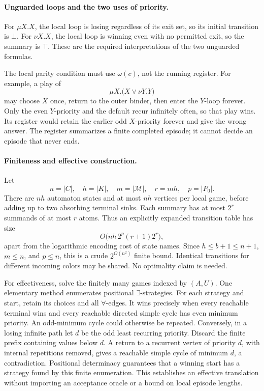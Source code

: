 \paragraph{Unguarded loops and the two uses of priority.}
For \(\mu X.X\), the local loop is
losing regardless of its exit set,
so its initial transition is \(\bot\).
For \(\nu X.X\), the local loop is
winning even with no permitted exit,
so the summary is \(\top\).
These are the required interpretations
of the two unguarded formulas.

The local parity condition must use
\(\omega(c)\), not the running register.
For example, a play of
\[
 \mu X.\bigl(X\lor\nu Y.Y\bigr)
\]
may choose \(X\) once, return to the
outer binder, then enter the
\(Y\)-loop forever.
Only the even \(Y\)-priority and
the default recur infinitely often,
so that play wins. Its register
would retain the earlier odd
\(X\)-priority forever and give
the wrong answer. The register
summarizes a finite completed
episode; it cannot decide an
episode that never ends.

\paragraph{Finiteness and effective construction.}
\label{sec:p09-mu-automaton-finiteness}
Let
\[
 n=|C|,\quad h=|K|,\quad
 m=|\mathcal M|,\quad r=mh,\quad p=|P_0|.
\]
There are \(nh\) automaton states and
at most \(nh\) vertices per local
game, before adding up to two
absorbing terminal sinks.
Each summary has at most \(2^r\)
summands of at most \(r\) atoms.
Thus an explicitly expanded transition
table has size
\[
 O\bigl(nh\,2^p(r+1)2^r\bigr),
\]
apart from the logarithmic encoding
cost of state names. Since
\(h\le b+1\le n+1\), \(m\le n\),
and \(p\le n\), this is a crude
\(2^{O(n^2)}\) finite bound.
Identical transitions for different
incoming colors may be shared.
No optimality claim is needed.

For effectiveness, solve the finitely
many games indexed by \((A,U)\).
One elementary method enumerates
positional \(\exists\)-strategies.
For each strategy and start, retain
its choices and all \(\forall\)-edges.
It wins precisely when every
reachable terminal wins and every
reachable directed simple cycle
has even minimum priority.
An odd-minimum cycle could otherwise
be repeated. Conversely, in a losing
infinite path let \(d\) be the odd
least recurring priority. Discard
the finite prefix containing values
below \(d\). A return to a recurrent
vertex of priority \(d\), with
internal repetitions removed,
gives a reachable simple cycle
of minimum \(d\), a contradiction.
Positional determinacy guarantees
that a winning start has a strategy
found by this finite enumeration.
This establishes an effective
translation without importing an
acceptance oracle or a bound on
local episode lengths.

